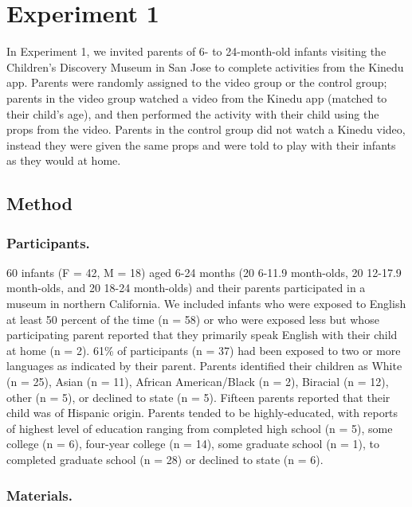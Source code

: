\documentclass[]{article}
\begin{document}
\hypertarget{experiment-1}{%
\section{Experiment 1}\label{experiment-1}}

In Experiment 1, we invited parents of 6- to 24-month-old infants
visiting the Children's Discovery Museum in San Jose to complete
activities from the Kinedu app. Parents were randomly assigned to the
video group or the control group; parents in the video group watched a
video from the Kinedu app (matched to their child's age), and then
performed the activity with their child using the props from the video.
Parents in the control group did not watch a Kinedu video, instead they
were given the same props and were told to play with their infants as
they would at home.

\hypertarget{method}{%
\subsection{Method}\label{method}}

\hypertarget{participants.}{%
\subsubsection{Participants.}\label{participants.}}

60 infants (F = 42, M = 18) aged 6-24 months (20 6-11.9 month-olds, 20
12-17.9 month-olds, and 20 18-24 month-olds) and their parents
participated in a museum in northern California. We included infants who
were exposed to English at least 50 percent of the time (n = 58) or who
were exposed less but whose participating parent reported that they
primarily speak English with their child at home (n = 2). 61\% of
participants (n = 37) had been exposed to two or more languages as
indicated by their parent. Parents identified their children as White (n
= 25), Asian (n = 11), African American/Black (n = 2), Biracial (n =
12), other (n = 5), or declined to state (n = 5). Fifteen parents
reported that their child was of Hispanic origin. Parents tended to be
highly-educated, with reports of highest level of education ranging from
completed high school (n = 5), some college (n = 6), four-year college
(n = 14), some graduate school (n = 1), to completed graduate school (n
= 28) or declined to state (n = 6).

\hypertarget{materials.}{%
\subsubsection{Materials.}\label{materials.}}
\end{document}
